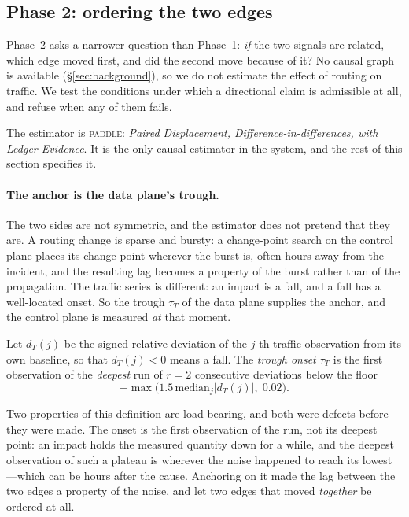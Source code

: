 \subsection{Phase 2: ordering the two edges}
\label{sec:method-est}

Phase~2 asks a narrower question than Phase~1: \emph{if} the two signals
are related, which edge moved first, and did the second move because of
it? No causal graph is available (\S\ref{sec:background}), so we do not
estimate the effect of routing on traffic. We test the conditions under
which a directional claim is admissible at all, and refuse when any of
them fails.

The estimator is \textsc{paddle}: \emph{Paired Displacement,
Difference-in-differences, with Ledger Evidence}. It is the only causal
estimator in the system, and the rest of this section specifies it.

\paragraph{The anchor is the data plane's trough.} The two sides are not
symmetric, and the estimator does not pretend that they are. A routing
change is sparse and bursty: a change-point search on the control plane
places its change point wherever the burst is, often hours away from the
incident, and the resulting lag becomes a property of the burst rather
than of the propagation. The traffic series is different: an impact is a
fall, and a fall has a well-located onset. So the trough $\tau_T$ of the
data plane supplies the anchor, and the control plane is measured
\emph{at} that moment.

\begin{definition}
\label{def:trough}
Let $d_T(j)$ be the signed relative deviation of the $j$-th traffic
observation from its own baseline, so that $d_T(j)<0$ means a fall. The
\emph{trough onset} $\tau_T$ is the first observation of the
\emph{deepest} run of $r=2$ consecutive deviations below the floor
\[
-\max\bigl(1.5\,\mathrm{median}_j|d_T(j)|,\;0.02\bigr).
\]
\end{definition}

Two properties of this definition are load-bearing, and both were
defects before they were made. The onset is the first observation of
the run, not its deepest point: an impact holds the measured quantity
down for a while, and the deepest observation of such a plateau is
wherever the noise happened to reach its lowest---which can be hours
after the cause. Anchoring on it made the lag between the two edges a
property of the noise, and let two edges that moved \emph{together} be
ordered at all.

